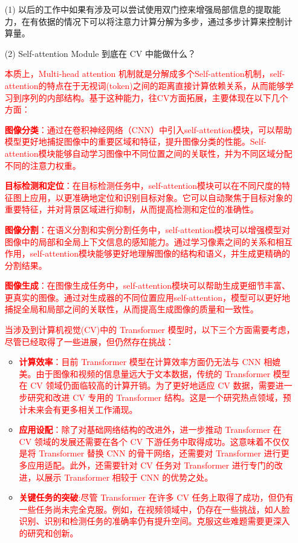 \documentclass[letterpaper,10pt]{article}
\begin{document}
	\begin{itemize}
		\item [(1)] 以后的工作中如果有涉及可以尝试使用双门控来增强局部信息的提取能力，在有依据的情况下可以将注意力计算分解为多步，通过多步计算来控制计算量。
		
		\item [(2)] Self-attention Module 到底在 CV 中能做什么？
		
		\textcolor{red}{本质上，Multi-head attention 机制就是分解成多个Self-attention机制，self-attention的特点在于无视词(token)之间的距离直接计算依赖关系，从而能够学习到序列的内部结构。基于这种能力，往CV方面拓展，主要体现在以下几个方面：}
		
		\textcolor{red}{\textbf{图像分类}：通过在卷积神经网络（CNN）中引入self-attention模块，可以帮助模型更好地捕捉图像中的重要区域和特征，提升图像分类的性能。Self-attention模块能够自动学习图像中不同位置之间的关联性，并为不同区域分配不同的注意力权重。}
		
		\textcolor{red}{\textbf{目标检测和定位}：在目标检测任务中，self-attention模块可以在不同尺度的特征图上应用，以更准确地定位和识别目标对象。它可以自动聚焦于目标对象的重要特征，并对背景区域进行抑制，从而提高检测和定位的准确性。}
		
		\textcolor{red}{\textbf{图像分割}：在语义分割和实例分割任务中，self-attention模块可以增强模型对图像中的局部和全局上下文信息的感知能力。通过学习像素之间的关系和相互作用，self-attention模块能够更好地理解图像的结构和语义，并生成更精确的分割结果。}
		
		\textcolor{red}{\textbf{图像生成}：在图像生成任务中，self-attention模块可以帮助生成更细节丰富、更真实的图像。通过对生成器的不同位置应用self-attention，模型可以更好地捕捉全局和局部之间的关联性，从而提高生成图像的质量和一致性。}
		
		\textcolor{red}{当涉及到计算机视觉(CV)中的 Transformer 模型时，以下三个方面需要考虑，尽管已经取得了一些进展，但仍然存在挑战：}
		
		\begin{itemize}
			\item {}
			\textcolor{red}{\textbf{计算效率}：目前 Transformer 模型在计算效率方面仍无法与 CNN 相媲美。由于图像和视频的信息量远大于文本数据，传统的 Transformer 模型在 CV 领域仍面临较高的计算开销。为了更好地适应 CV 数据，需要进一步研究和改进 CV 专用的 Transformer 结构。这是一个研究热点领域，预计未来会有更多相关工作涌现。}
			
			\item {}
			\textcolor{red}{\textbf{应用设配}：除了对基础网络结构的改进外，进一步推动 Transformer 在 CV 领域的发展还需要在各个 CV 下游任务中取得成功。这意味着不仅仅是将 Transformer 替换 CNN 的骨干网络，还需要对 Transformer 进行更多应用适配。此外，还需要针对 CV 任务对 Transformer 进行专门的改进，以展示 Transformer 相较于 CNN 的优势之处。}
			
			\item {}
			\textcolor{red}{\textbf{关键任务的突破}:尽管 Transformer 在许多 CV 任务上取得了成功，但仍有一些任务尚未完全克服。例如，在视频领域中，仍存在一些挑战，如人脸识别、识别和检测任务的准确率仍有提升空间。克服这些难题需要更深入的研究和创新。}
		\end{itemize}	
		
	\end{itemize}
\end{document}
